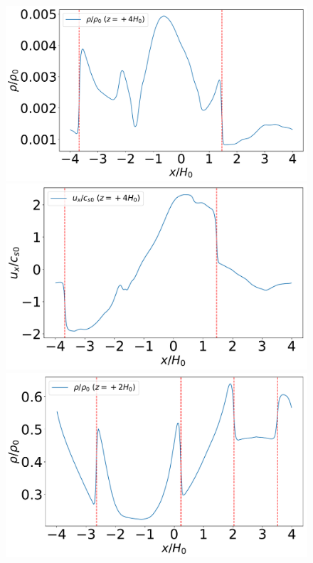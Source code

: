 \documentclass[fleqn,usenatbib]{mnras}
\begin{document}
\begin{figure}
\centering
\includegraphics[scale=0.30]{Figures/figure00PRODUCTION_VSTRHYDRORes32Re4687H6BouncezBCReflectiveLx8H_rho_1Dverticalslice_z4H0.pdf}
\includegraphics[scale=0.30]{Figures/figure00PRODUCTION_VSTRHYDRORes32Re4687H6BouncezBCReflectiveLx8H_vx1_1Dverticalslice_z4H0.pdf}
\includegraphics[scale=0.30]{Figures/figure00PRODUCTION_VSTRHYDRORes32Re4687H6BouncezBCReflectiveLx8H_rho_1Dverticalslice_z2H0.pdf}

\end{figure}
\end{document}
